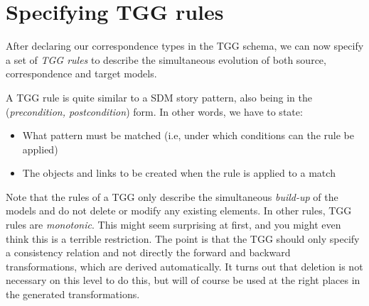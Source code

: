 \newpage
\section{Specifying TGG rules}
\genHeader

After declaring our correspondence types in the TGG schema, we can now specify a set of \emph{TGG rules} to describe the simultaneous evolution of both source,
correspondence and target models.

A TGG rule is quite similar to a  SDM story pattern, also being in the (\emph{precondition, postcondition}) form. In other words, we have to state:

\begin{itemize}
  \item What pattern must be matched (i.e, under which conditions can the rule be applied)
  \item The objects and links to be created when the rule is applied to a match 
\end{itemize}

Note that the rules of a TGG only describe the simultaneous \emph{build-up} of the models and do not delete or modify any existing elements. In other rules, TGG
rules are \emph{monotonic}. This might seem surprising at first, and you might even think this is a terrible restriction. The point is that the TGG should only
specify a consistency relation and not directly the forward and backward transformations, which are derived automatically. It turns out that deletion is not necessary on this level to do this, but will of course be used at the right places in the generated transformations.




